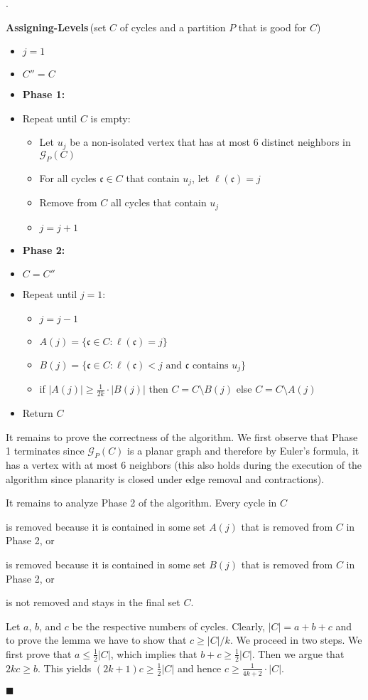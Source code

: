 \documentclass[11pt]{article}
\newenvironment{proof}{\noindent {\bf Proof}.\ }{\qed \par\vskip 4mm\par}
\newcommand{\sq}{\hbox{\rlap{$\sqcap$}$\sqcup$}}
\newcommand{\qed}{\hspace*{\fill}\sq}
\renewcommand{\qed}{\hspace*{\fill}\ensuremath{\blacksquare}}
\newcommand{\AL}{\textbf{Assigning-Levels}}
\begin{document}
\begin{proof}
\medskip
\begin{algo}
\AL\,(set $C$ of cycles and a partition $P$ that is good for $C$)
\begin{itemize}
\item $j=1$
\item $C''=C$
\item[] \textbf{\!\!Phase 1:}
\item Repeat until $C$ is empty:
    \begin{itemize}[$\circ$]
    \item Let $u_j$ be a non-isolated vertex that has at most 6 distinct neighbors in $\mathcal G_{P}(C)$
    \item For all cycles $\mathfrak{c} \in C$ that contain $u_j$, let $\ell(\mathfrak{c})=j$
		\item Remove from $C$ all cycles that contain $u_j$
    \item $j=j+1$
		\end{itemize}
\item[]\textbf{\!\!Phase 2:}
\item $C=C''$
\item Repeat until $j=1$:
     \begin{itemize}[$\circ$]
		 \item $j=j-1$
		 \item $A(j) = \{\mathfrak{c} \in C: \ell(\mathfrak{c}) = j\}$
		 \item $B(j) = \{\mathfrak{c} \in C: \ell(\mathfrak{c}) < j \text{ and } \mathfrak{c} \text{ contains } u_j\}$
	   \item if $|A(j)| \ge \frac{1}{2k} \cdot |B(j)|$ then
		       $C = C \setminus B(j)$ else $C=C \setminus A(j)$
		 \end{itemize}
\item Return $C$
\end{itemize}
\end{algo}


It remains to prove the correctness of the algorithm. We first observe that Phase 1 terminates since $\mathcal G_{P}(C)$ is a planar graph and therefore by Euler's formula, it has a vertex with at most
{6}
neighbors (this also holds during the execution of the algorithm since planarity is closed under edge removal and contractions).

It remains to analyze Phase 2 of the algorithm. Every cycle in $C$
\begin{inparaenum}[(a)]
\item is removed because it is contained in some set $A(j)$ that is removed from $C$ in Phase 2, or
\item is removed because it is contained in some set $B(j)$ that is removed from $C$ in Phase 2, or
\item is not removed and stays in the final set $C$.
\end{inparaenum}
Let $a$, $b$, and $c$ be the respective numbers of cycles. Clearly, $|C|=a+b+c$ and to prove the lemma we have to show that $c \ge |C|/k$. We proceed in two steps. We first prove that $a \le \frac12 |C|$, which implies that $b + c \ge \frac12 |C|$. Then we argue that $2 k c \ge b$. This yields $(2k+1) c \ge \frac12 |C|$ and hence $c \ge \frac{1}{4k+2} \cdot |C|$.


\end{proof}
\end{document}
